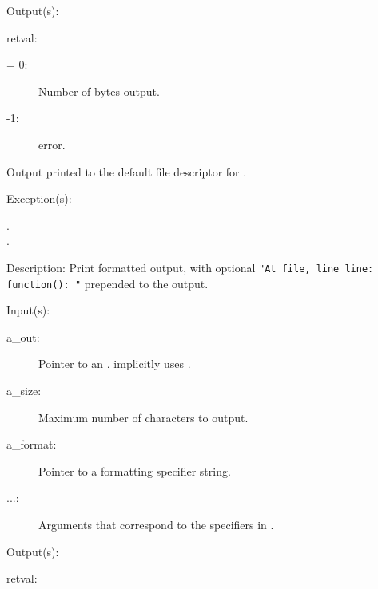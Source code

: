 \begin{capi}
\begin{capilist}
	\item[Output(s): ]
		\item[retval: ]
			\begin{description}\item[]
			\item[{\gt}= 0: ]
				Number of bytes output.
			\item[-1: ]
				 error.
			\end{description}
		\item{Output printed to the default file descriptor for
			.}
	\item[Exception(s): ]
		\begin{description}\item[]
		\item[.]
		\item[.]
		\end{description}
	\item[Description: ]
		Print formatted output, with optional {\tt "At {\lt}file{\gt},
		line {\lt}line{\gt}: {\lt}function{\gt}(): "} prepended to the
		output.
	\end{capilist}
\label{out_put_n}
\label{_cw_out_put_n}
	\begin{capilist}
	\item[Input(s): ]
		\begin{description}\item[]
		\item[a\_out: ]
			Pointer to an .
			 implicitly uses
			.
		\item[a\_size: ]
			Maximum number of characters to output.
		\item[a\_format: ]
			Pointer to a formatting specifier string.
		\item[...: ]
			Arguments that correspond to the specifiers in
			.
		\end{description}
	\item[Output(s): ]
		\begin{description}\item[]
		\item[retval: ]

\end{description}
\end{capilist}
\end{capi}
